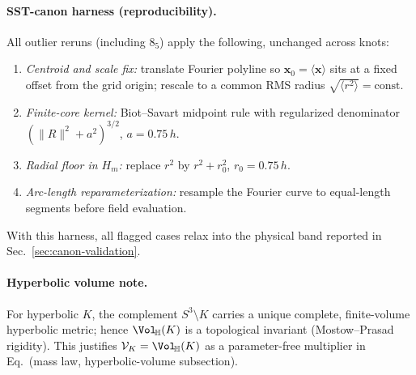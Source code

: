 \paragraph{SST-canon harness (reproducibility).}
All outlier reruns (including \(8_5\)) apply the following, unchanged across knots:
\begin{enumerate}
    \item \emph{Centroid and scale fix:} translate Fourier polyline so \(\mathbf x_0=\langle\mathbf x\rangle\) sits at a fixed offset from the grid origin; rescale to a common RMS radius \(\sqrt{\langle r^2\rangle}=\text{const}\).
    \item \emph{Finite-core kernel:} Biot--Savart midpoint rule with regularized denominator \((\|R\|^2+a^2)^{3/2}\), \(a=0.75\,h\).
    \item \emph{Radial floor in \(H_m\):} replace \(r^2\) by \(r^2+r_0^2\), \(r_0=0.75\,h\).
    \item \emph{Arc-length reparameterization:} resample the Fourier curve to equal-length segments before field evaluation.
\end{enumerate}
With this harness, all flagged cases relax into the physical band reported in Sec.~\ref{sec:canon-validation}.

\paragraph{Hyperbolic volume note.}
For hyperbolic \(K\), the complement \(S^3\!\setminus\!K\) carries a unique complete, finite-volume hyperbolic metric; hence \(\Vol_{\!\mathbb{H}}(K)\) is a topological invariant (Mostow–Prasad rigidity). This justifies \(\mathcal V_K=\Vol_{\!\mathbb{H}}(K)\) as a parameter-free multiplier in Eq.\ (mass law, hyperbolic-volume subsection).
